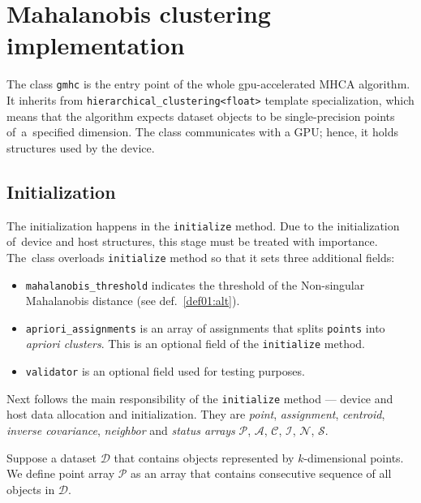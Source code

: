 \section{Mahalanobis clustering implementation}
\label{sec03:gmhc}

The class \texttt{gmhc} is the entry point of the whole gpu-accelerated MHCA algorithm. It inherits from \texttt{hierarchical\_clustering<float>} template specialization, which means that the algorithm expects dataset objects to be single-precision points of~a~specified dimension. The class communicates
with a GPU; hence, it holds structures used by the device.

\subsection{Initialization}

The initialization happens in the \texttt{initialize} method. Due to the initialization of~device and host structures, this stage must be treated with importance.
The~class overloads \texttt{initialize} method so that it sets three additional fields:
\begin{itemize}
	\item \texttt{mahalanobis\_threshold} indicates the threshold of the Non-singular Mahalanobis distance (see def.~\ref{def01:alt}).
	
	\item\texttt{apriori\_assignments}  is an array of assignments that splits \texttt{points} into \emph{apriori clusters}. This is an optional field of the \texttt{initialize} method.
	
	\item \texttt{validator} is an optional field used for testing purposes.
\end{itemize}

Next follows the main responsibility of the \texttt{initialize} method --- device and host data allocation and initialization. They are \emph{point}, \emph{assignment}, \emph{centroid}, \emph{inverse covariance}, \emph{neighbor} and \emph{status arrays} $\mathcal{P}$, $\mathcal{A}$, $\mathcal{C}$, $\mathcal{I}$, $\mathcal{N}$, $\mathcal{S}$. 

\begin{defn}
	Suppose a dataset $\mathcal{D}$ that contains objects represented by $k$-di\-men\-si\-onal points. We define point array $\mathcal{P}$ as an array that contains consecutive sequence of all objects in $\mathcal{D}$.
	\label{def03:point}
\end{defn}

